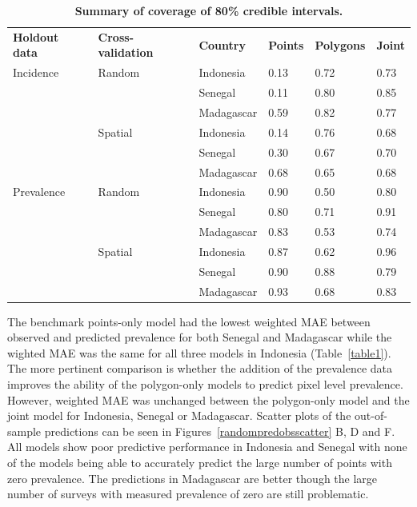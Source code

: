 \documentclass[10pt,letterpaper]{article}
\newlength\savedwidth
\newcommand\thickhline{\noalign{\global\savedwidth\arrayrulewidth\global\arrayrulewidth 2pt}%
\hline
\noalign{\global\arrayrulewidth\savedwidth}}
\begin{document}
\begin{table}[t]
\begin{adjustwidth}{-2.25in}{0in} %
\centering
\caption{
{\bf Summary of coverage of 80\% credible intervals.}}
\begin{tabular}{llllll}
\hline
{\bf Holdout data} & {\bf Cross-validation} & {\bf Country} &  {\bf Points} & {\bf Polygons} & {\bf Joint} \\
\thickhline 
Incidence & Random & Indonesia & 0.13 & 0.72 &  0.73\\
&& Senegal & 0.11 & 0.80 &  0.85\\
&& Madagascar & 0.59 & 0.82 &  0.77\vspace{1mm}\\
& Spatial & Indonesia & 0.14 & 0.76 &  0.68\\
&& Senegal & 0.30 & 0.67 &  0.70\\
&& Madagascar & 0.68 & 0.65 &  0.68\vspace{3mm} \\
Prevalence & Random & Indonesia & 0.90 & 0.50 &  0.80\\
&& Senegal & 0.80 & 0.71 &  0.91\\
&& Madagascar & 0.83 & 0.53 &  0.74\vspace{1mm}\\
& Spatial & Indonesia & 0.87 & 0.62 &  0.96\\
&& Senegal & 0.90 & 0.88 &  0.79\\
&& Madagascar & 0.93 & 0.68 &  0.83\\
\end{tabular}
\begin{flushleft}

\end{flushleft}
\label{table3}
\end{adjustwidth}
\end{table}


The benchmark points-only model had the lowest weighted MAE between observed and predicted prevalence for both Senegal and  Madagascar while the wighted MAE was the same for all three models in Indonesia (Table~\ref{table1}).
The more pertinent comparison is whether the addition of the prevalence data improves the ability of the polygon-only models to predict pixel level prevalence.
However, weighted MAE was unchanged between the polygon-only model and the joint model for Indonesia, Senegal or Madagascar.
Scatter plots of the out-of-sample predictions can be seen in Figures~\ref{randompredobsscatter} B, D and F.
All models show poor predictive performance in Indonesia and Senegal with none of the models being able to accurately predict the large number of points with zero prevalence.
The predictions in Madagascar are better though the large number of surveys with measured prevalence of zero are still problematic. 
\end{document}
